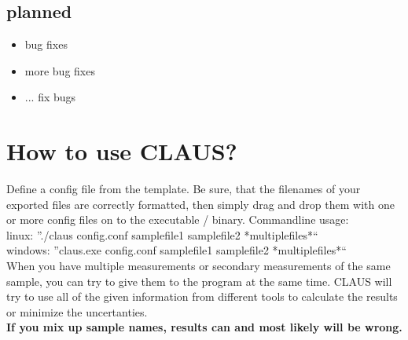 \documentclass[a4paper,10pt]{article}
\begin{document}
\subsection{planned}
\begin{itemize}
 \item bug fixes
 \item more bug fixes
 \item ... fix bugs
\end{itemize}


\section{How to use CLAUS?}
Define a config file from the template. Be sure, that the filenames of your exported files are correctly formatted, then simply drag and drop them with one or more config files on to the executable / binary.
Commandline usage: \\
linux: ''./claus config.conf samplefile1 samplefile2 *multiplefiles*`` \\
windows: ''claus.exe config.conf samplefile1 samplefile2 *multiplefiles*`` \\
When you have multiple measurements or secondary measurements of the same sample, you can try to give them to the program at the same time. CLAUS will try to use all of the given information from different tools to calculate the results or minimize the uncertanties.  \\
\textbf{If you mix up sample names, results can and most likely will be wrong.}
\end{document}

